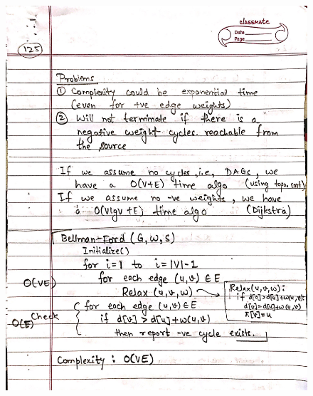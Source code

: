 \begin{figure}[H]
    \centering
    \includegraphics[width=16cm, height=21cm]{"./MIT-6.006/MIT-6006-125"}
\end{figure}
\newpage
